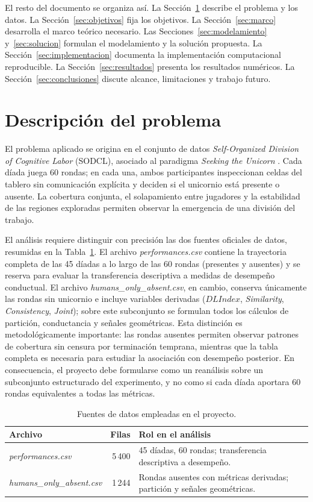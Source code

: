 \documentclass[journal]{IEEEtran}
\begin{document}
El resto del documento se organiza así. La Sección~\ref{sec:problema} describe el problema y los datos. La Sección~\ref{sec:objetivos} fija los objetivos. La Sección~\ref{sec:marco} desarrolla el marco teórico necesario. Las Secciones~\ref{sec:modelamiento} y~\ref{sec:solucion} formulan el modelamiento y la solución propuesta. La Sección~\ref{sec:implementacion} documenta la implementación computacional reproducible. La Sección~\ref{sec:resultados} presenta los resultados numéricos. La Sección~\ref{sec:conclusiones} discute alcance, limitaciones y trabajo futuro.

\section{Descripción del problema}\label{sec:problema}

El problema aplicado se origina en el conjunto de datos \emph{Self-Organized Division of Cognitive Labor} (SODCL), asociado al paradigma \emph{Seeking the Unicorn} \cite{andrade2021}. Cada díada juega 60 rondas; en cada una, ambos participantes inspeccionan celdas del tablero sin comunicación explícita y deciden si el unicornio está presente o ausente. La cobertura conjunta, el solapamiento entre jugadores y la estabilidad de las regiones exploradas permiten observar la emergencia de una división del trabajo.

El análisis requiere distinguir con precisión las dos fuentes oficiales de datos, resumidas en la Tabla~\ref{tab:datasets}. El archivo \emph{performances.csv} contiene la trayectoria completa de las 45 díadas a lo largo de las 60 rondas (presentes y ausentes) y se reserva para evaluar la transferencia descriptiva a medidas de desempeño conductual. El archivo \emph{humans\_only\_absent.csv}, en cambio, conserva únicamente las rondas sin unicornio e incluye variables derivadas ($DLIndex$, \emph{Similarity}, \emph{Consistency}, \emph{Joint}); sobre este subconjunto se formulan todos los cálculos de partición, conductancia y señales geométricas. Esta distinción es metodológicamente importante: las rondas ausentes permiten observar patrones de cobertura sin censura por terminación temprana, mientras que la tabla completa es necesaria para estudiar la asociación con desempeño posterior. En consecuencia, el proyecto debe formularse como un reanálisis sobre un subconjunto estructurado del experimento, y no como si cada díada aportara 60 rondas equivalentes a todas las métricas.

\begin{table}[t]
\centering
\small
\caption{Fuentes de datos empleadas en el proyecto.}
\label{tab:datasets}
\begin{tabular}{@{}lrp{}@{}}
\toprule
\textbf{Archivo} & \textbf{Filas} & \textbf{Rol en el análisis} \\
\midrule
\emph{performances.csv} & 5\,400 & 45 díadas, 60 rondas; transferencia descriptiva a desempeño. \\
\addlinespace
\emph{humans\_only\_absent.csv} & 1\,244 & Rondas ausentes con métricas derivadas; partición y señales geométricas. \\
\bottomrule
\end{tabular}
\end{table}
\end{document}

